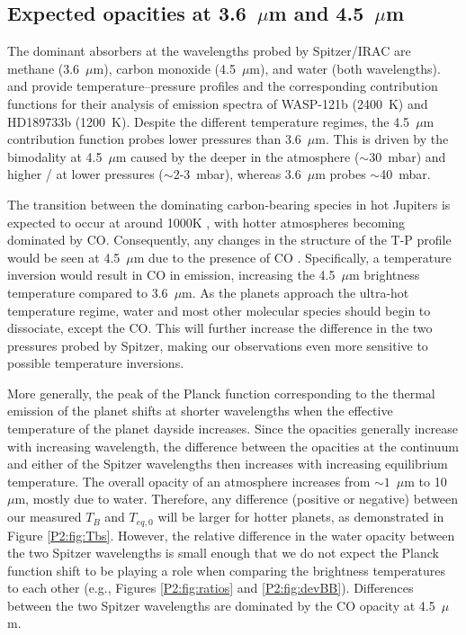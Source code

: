 \subsection{Expected opacities at 3.6~$\mu$m and 4.5~$\mu$m}

The dominant absorbers at the wavelengths probed by Spitzer/IRAC are methane (3.6~$\mu$m), carbon monoxide (4.5~$\mu$m), and water (both wavelengths). \citet{Parmentier2018b} and \citet{Lee2012} provide temperature--pressure profiles and the corresponding contribution functions for their analysis of emission spectra of WASP-121b (2400~K) and HD189733b (1200~K). Despite the different temperature regimes, the 4.5~$\mu$m contribution function probes lower pressures than 3.6~$\mu$m. This is driven by the bimodality at 4.5~$\mu$m caused by the  deeper in the atmosphere ($\sim$30~mbar) and higher  /  at lower pressures ($\sim$2-3~mbar), whereas 3.6~$\mu$m probes $\sim$40~mbar.

The transition between the dominating carbon-bearing species in hot Jupiters is expected to occur at around 1000K \citep[e.g.,][]{Zahnle2014, Ebbing2016, Molaverdikhani2019}, with hotter atmospheres becoming dominated by CO. Consequently, any changes in the structure of the T-P profile would be seen at 4.5~$\mu$m due to the presence of CO \citep{Fortney2008, Parmentier2018b, Arcangeli2018}. Specifically, a temperature inversion would result in CO in emission, increasing the 4.5~$\mu$m brightness temperature compared to 3.6~$\mu$m. As the planets approach the ultra-hot temperature regime, water and most other molecular species should begin to dissociate, except the CO. This will further increase the difference in the two pressures probed by Spitzer, making our observations even more sensitive to possible temperature inversions.

More generally, the peak of the Planck function corresponding to the thermal emission of the planet shifts at shorter wavelengths when the effective temperature of the planet dayside increases. Since the opacities generally increase with increasing wavelength, the difference between the opacities at the continuum and either of the Spitzer wavelengths then increases with increasing equilibrium temperature. The overall opacity of an atmosphere increases from $\sim1$~$\mu$m to 10~$\mu$m, mostly due to water. Therefore, any difference (positive or negative) between our measured $T_B$ and $T_{eq,\textit{0}}$ will be larger for hotter planets, as demonstrated in Figure \ref{P2:fig:Tbs}. However, the relative difference in the water opacity between the two Spitzer wavelengths is small enough that we do not expect the Planck function shift to be playing a role when comparing the brightness temperatures to each other (e.g., Figures \ref{P2:fig:ratios} and \ref{P2:fig:devBB}). Differences between the two Spitzer wavelengths are dominated by the CO opacity at 4.5~$\mu$m.

